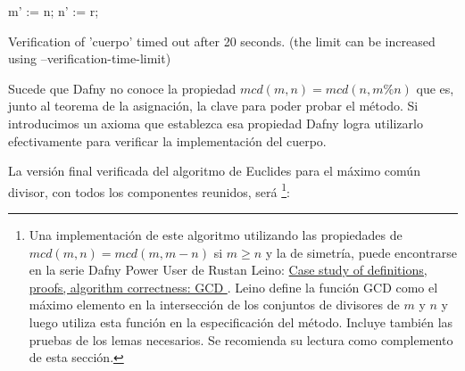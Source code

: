 \documentclass[12pt, a4paper, openany, fleqn]{book}
\begin{document}
    \begin{whitebox}
    \begin{dafny}[gobble=8,firstnumber=8]
            m' := n;
            n' := r;
    \end{dafny}
    \end{whitebox}
    \begin{redbox}[after skip=2ex]
    \begin{dafny}[gobble=8,firstnumber=11]
        }
    \end{dafny}
    \end{redbox}

    \begin{redbox}[after skip=2ex]
        Verification of 'cuerpo' timed out after 20 seconds. (the limit can be increased using --verification-time-limit)
    \end{redbox}


    Sucede que Dafny no conoce la propiedad $mcd(m, n) = mcd(n, m\%n)$ que es, junto al teorema de la asignación, la clave para poder probar el método. Si introducimos un axioma que establezca esa propiedad Dafny logra utilizarlo efectivamente para verificar la implementación del cuerpo.

    \begin{greenbox}
    \end{greenbox}

    La versión final verificada del algoritmo de Euclides para el máximo común divisor, con todos los componentes reunidos, será \footnote{
    Una implementación de este algoritmo utilizando las propiedades de $mcd(m, n) = mcd(m, m - n)$ si $m \ge n$ y la de simetría, puede encontrarse en la serie Dafny Power User de Rustan Leino: \href{https://leino.science/papers/krml279.html}{Case study of definitions, proofs, algorithm correctness: GCD
    }. Leino define la función GCD como el máximo elemento en la intersección de los conjuntos de divisores de $m$ y $n$ y luego utiliza esta función en la especificación del método. Incluye también las pruebas de los lemas necesarios. Se recomienda su lectura como complemento de esta sección.}:
\end{document}
